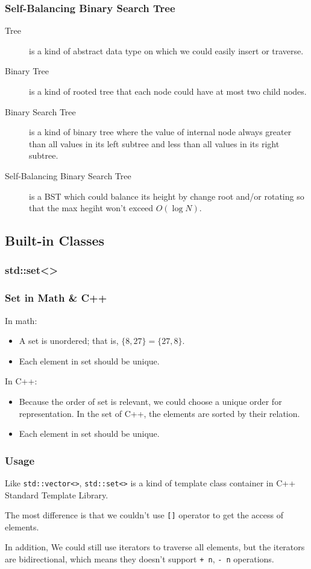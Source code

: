 \documentclass{beamer}
\begin{document}
\frame
{
	\frametitle{Self-Balancing Binary Search Tree}
	
	\begin{description}
		\item[Tree] is a kind of abstract data type on which we could easily insert or traverse.\pause
		\item[Binary Tree] is a kind of rooted tree that each node could have at most two child nodes.\pause
		\item[Binary Search Tree] is a kind of binary tree where the value of internal node always greater than all values in its left subtree and less than all values in its right subtree.\pause
		\item[Self-Balancing Binary Search Tree] is a BST which could balance its height by change root and/or rotating so that the max hegiht won't exceed $O(\log N)$.
	\end{description}
}

\subsection{Built-in Classes}

\subsubsection{std::set<>}

\frame
{
	\frametitle{Set in Math \& C++}
	
	In math:
	\begin{itemize}
		\item<1-> A set is unordered; that is, $\{8, 27\} = \{27, 8\}$.
		\item<2-> Each element in set should be unique.
	\end{itemize}
	
	In C++:
	\begin{itemize}
		\item<1-> Because the order of set is relevant, we could choose a unique order for representation. In the set of C++, the elements are sorted by their relation.
		\item<2-> Each element in set should be unique.
	\end{itemize}
}

\frame
{
	\frametitle{Usage}
	
	Like \texttt{std::vector<>}, \texttt{std::set<>} is a kind of template class container in C++ Standard Template Library.
	
	The most difference is that we couldn't use \texttt{[]} operator to get the access of elements.
	
	In addition, We could still use iterators to traverse all elements, but the iterators are bidirectional, which means they doesn't support \texttt{+ n}, \texttt{- n} operations.
}
\end{document}
